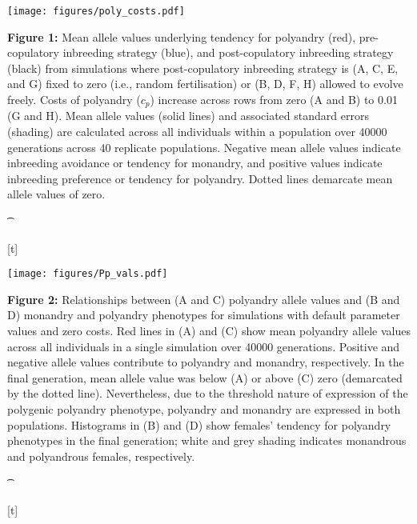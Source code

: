 \documentclass[10pt,letterpaper]{article}
\begin{document}
 {\color{Gray}
\begin{adjustwidth}{-2.2in}{0in}
{%
   \texttt{[image: figures/poly\_costs.pdf]}%
}%
{%
   \begin{justify}\vspace{10 mm} \textbf{Figure 1:} Mean allele values underlying tendency for polyandry (red), pre-copulatory inbreeding strategy (blue), and post-copulatory inbreeding strategy (black) from simulations where post-copulatory inbreeding strategy is (A, C, E, and G) fixed to zero (i.e., random fertilisation) or (B, D, F, H) allowed to evolve freely. Costs of polyandry ($c_{p}$) increase across rows from zero (A and B) to 0.01 (G and H). Mean allele values (solid lines) and associated standard errors (shading) are calculated across all individuals within a population over 40000 generations across 40 replicate populations. Negative mean allele values indicate inbreeding avoidance or tendency for monandry, and positive values indicate inbreeding preference or tendency for polyandry. Dotted lines demarcate mean allele values of zero. \end{justify}{\t}%
}[t]
\end{adjustwidth}
}


{\color{Gray}
\begin{adjustwidth}{-2.2in}{0in}
{%
   \texttt{[image: figures/Pp\_vals.pdf]}%
}%
{%
   \begin{justify}\vspace{0.25 mm} \textbf{Figure 2:} Relationships between (A and C) polyandry allele values and (B and D) monandry and polyandry phenotypes for simulations with default parameter values and zero costs. Red lines in (A) and (C) show mean polyandry allele values across all individuals in a single simulation over 40000 generations. Positive and negative allele values contribute to polyandry and monandry, respectively. In the final generation, mean allele value was below (A) or above (C) zero (demarcated by the dotted line). Nevertheless, due to the threshold nature of expression of the polygenic polyandry phenotype, polyandry and monandry are expressed in both populations. Histograms in (B) and (D) show females' tendency for polyandry phenotypes in the final generation; white and grey shading indicates monandrous and polyandrous females, respectively.\end{justify}{\t}%
}[t]
\end{adjustwidth}
}
\end{document}
